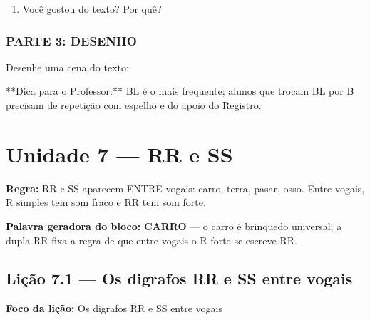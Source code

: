 \begin{exercicio}
\begin{enumerate}
  \item Você gostou do texto? Por quê?
  \begin{center}
  \underline{\hspace{12cm}}
  \end{center}

\end{enumerate}

\subsection*{PARTE 3: DESENHO}

Desenhe uma cena do texto:

\begin{center}
\end{center}

\end{exercicio}

\begin{dica}
**Dica para o Professor:** BL é o mais frequente; alunos que trocam BL por B precisam de repetição com espelho e do apoio do Registro.
\end{dica}


\chapter{Unidade 7 --- RR e SS}


\textbf{Regra:} RR e SS aparecem ENTRE vogais: carro, terra, pasar, osso. Entre vogais, R simples tem som fraco e RR tem som forte.

\textbf{Palavra geradora do bloco:} \textbf{CARRO} --- o carro é brinquedo universal; a dupla RR fixa a regra de que entre vogais o R forte se escreve RR.

\section{Lição 7.1 --- Os digrafos RR e SS entre vogais}

\textbf{Foco da lição:} Os digrafos RR e SS entre vogais



